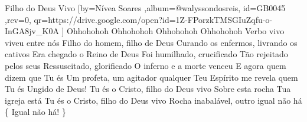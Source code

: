 \beginsong
{Filho do Deus Vivo %
}[by={Nívea Soares %
},album={@walyssondosreis},
id={GB0045 %
},rev={0}, %
qr={https://drive.google.com/open?id=1Z-FPorzkTMSGIuZqfu-o-InGA8jv_K0A %
}]
\beginverse* 
Ohhohohoh Ohhohohoh
Ohhohohoh Ohhohohoh
\endverse
\beginverse*
Verbo vivo viveu entre nós
Filho do homem, filho de Deus
Curando os enfermos, livrando os cativos
Era chegado o Reino de Deus
Foi humilhado, crucificado
Tão rejeitado pelos seus
Ressuscitado, glorificado
O inferno e a morte venceu
\endverse
\beginverse*
E agora quem dizem que Tu és
Um profeta, um agitador qualquer
Teu Espírito me revela quem Tu és
Ungido de Deus!
\endverse
\beginchorus
Tu és o Cristo, filho do Deus vivo
Sobre esta rocha Tua igreja está
Tu és o Cristo, filho do Deus vivo
Rocha inabalável, outro igual não há
\{ Igual não há! \}
\endchorus
\vspace{4em} %
\begin{comment}
\lstset{basicstyle=\scriptsize\bf} %
\tab{Solo 1}
\begin{lstlisting}
E|-----------------------------------------------------|
B|-----------------------------------------------------|
G|-----------------------------------------------------|
D|-----------------------------------------------------|
A|-----------------------------------------------------|
E|-----------------------------------------------------|
\end{lstlisting}
\end{comment}
 
